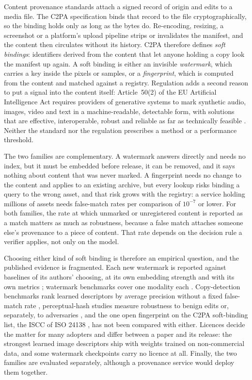 Content provenance standards attach a signed record of origin and edits to a media file. The C2PA specification \cite{c2pa2026spec} binds that record to the file cryptographically, so the binding holds only as long as the bytes do. Re-encoding, resizing, a screenshot or a platform's upload pipeline strips or invalidates the manifest, and the content then circulates without its history. C2PA therefore defines \emph{soft bindings}: identifiers derived from the content that let anyone holding a copy look the manifest up again. A soft binding is either an invisible \emph{watermark}, which carries a key inside the pixels or samples, or a \emph{fingerprint}, which is computed from the content and matched against a registry. Regulation adds a second reason to put a signal into the content itself: Article~50(2) of the EU Artificial Intelligence Act requires providers of generative systems to mark synthetic audio, images, video and text in a machine-readable, detectable form, with solutions that are effective, interoperable, robust and reliable as far as technically feasible \cite{eu2024aiact, eu2026omnibus}. Neither the standard nor the regulation prescribes a method or a performance threshold.

The two families are complementary. A watermark answers directly and needs no index, but it must be embedded before release, it can be removed, and it says nothing about content that was never marked. A fingerprint needs no change to the content and applies to an existing archive, but every lookup risks binding a query to the wrong asset, and that risk grows with the registry: a service holding millions of assets needs false-match rates per comparison of $10^{-7}$ or lower. For both families, the rate at which unmarked or unregistered content is reported as a match matters as much as robustness, because a false match attaches someone else's provenance to a piece of content. That rate depends on the decision rule a verifier applies, not only on the model.

Choosing either kind of soft binding is therefore an empirical question, and the published evidence is fragmented. Each new watermark is reported against baselines of its authors' choosing, at its own embedding strength and with its own metrics \cite{bui2025trustmark, xu2025invismark, soucek2025pixelseal, sanroman2024audioseal}; watermark benchmarks cover one modality each \cite{an2024waves, lu2025vine, liu2024audiomarkbench, jiang2025videomarkbench}. Copy-detection benchmarks rank learned descriptors by average precision without a fixed false-match rate \cite{douze2021isc}, perceptual-hash studies measure robustness to benign edits or, separately, to adversaries \cite{jain2022adversarial, prokos2023squint}, and the one open fingerprint on the C2PA soft-binding list, the ISCC of ISO 24138 \cite{iso24138}, has not been compared with either. Licences decide the matter for many adopters and differ between a paper and its release: the strongest learned image descriptors ship with weights trained on non-commercial data, and some watermark checkpoints carry no licence at all. Finally, the two families are evaluated separately, although a provenance service would deploy them together.

